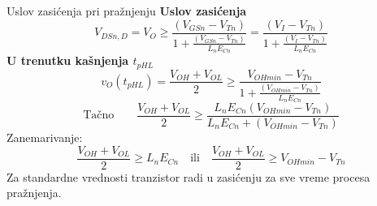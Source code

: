 \begin{frame}[label=09_1-s029]{Uslov zasićenja pri pražnjenju}\setlength{\parskip}{2pt}\setlength{\abovedisplayskip}{4pt}\setlength{\belowdisplayskip}{4pt}\setlength{\abovedisplayshortskip}{3pt}\setlength{\belowdisplayshortskip}{3pt}
\textbf{Uslov zasićenja}\[V_{DSn,D}=V_O\geq\frac{(V_{GSn}-V_{Tn})}{1+\frac{(V_{GSn}-V_{Tn})}{L_nE_{Cn}}}=\frac{(V_I-V_{Tn})}{1+\frac{(V_I-V_{Tn})}{L_nE_{Cn}}}\]
\textbf{U trenutku kašnjenja $t_{pHL}$}\[v_O(t_{pHL})=\frac{V_{OH}+V_{OL}}2\geq\frac{V_{OHmin}-V_{Tn}}{1+\frac{(V_{OHmin}-V_{Tn})}{L_nE_{Cn}}}\]
\[\text{Tačno}\qquad\frac{V_{OH}+V_{OL}}2\geq\frac{L_nE_{Cn}(V_{OHmin}-V_{Tn})}{L_nE_{Cn}+(V_{OHmin}-V_{Tn})}\]
Zanemarivanje:\[\frac{V_{OH}+V_{OL}}2\geq L_nE_{Cn}\quad\text{ili}\quad\frac{V_{OH}+V_{OL}}2\geq V_{OHmin}-V_{Tn}\]
Za standardne vrednosti tranzistor radi u zasićenju za sve vreme procesa pražnjenja.
\end{frame}
